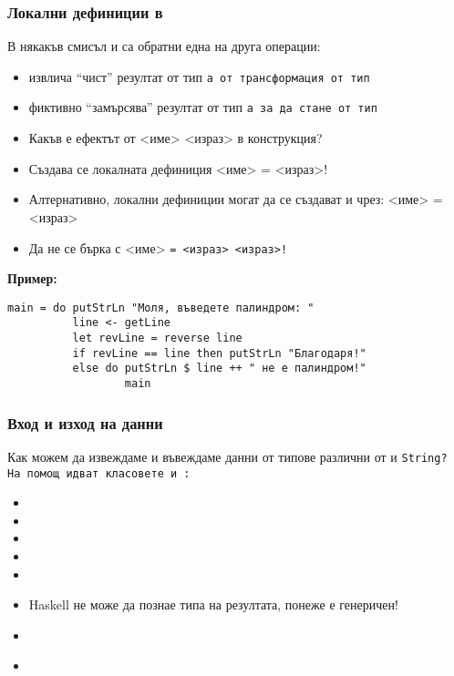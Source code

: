 \documentclass[alsotrans,beameroptions={aspectratio=169}]{beamerswitch}
\begin{document}
\begin{frame}
  \frametitle{Локални дефиниции в }
  \small
  В някакъв смисъл \lst{<-} и  са обратни една на друга операции:
  \begin{itemize}[<+->]
  \item \lst{<-} извлича ``чист'' резултат от тип \tt{a} от трансформация от тип 
  \item {} фиктивно ``замърсява'' резултат от тип \tt{a} за да стане от тип 
  \item Какъв е ефектът от <име>  <израз> в  конструкция?
  \item Създава се локалната дефиниция <име> = <израз>!
  \item Алтернативно, локални дефиниции могат да се създават и чрез:  <име> \tta= <израз>
  \item Да не се бърка с  <име> \tt= <израз>  <израз>!
  \end{itemize}
  \onslide<+->
  \textbf{Пример:}
  \vspace{-.5ex}
  \lstfootnotesize
\begin{lstlisting}
main = do putStrLn "Моля, въведете палиндром: "
          line <- getLine
          let revLine = reverse line
          if revLine == line then putStrLn "Благодаря!"
          else do putStrLn $ line ++ " не е палиндром!"
                  main
\end{lstlisting}
\end{frame}

\begin{frame}
  \frametitle{Вход и изход на данни}

  Как можем да извеждаме и въвеждаме данни от типове различни от  и \tt{String}?\\[2ex]
  \pause
  На помощ идват класовете  и :
  \begin{itemize}[<+->]
  \item {}
  \item {}
  \item {}
  \item {}
  \item {}
  \item Haskell не може да познае типа на резултата, понеже е генеричен!
  \item {}
  \item {}\\
    \hspace{7em}
  \end{itemize}
\end{frame}
\end{document}
